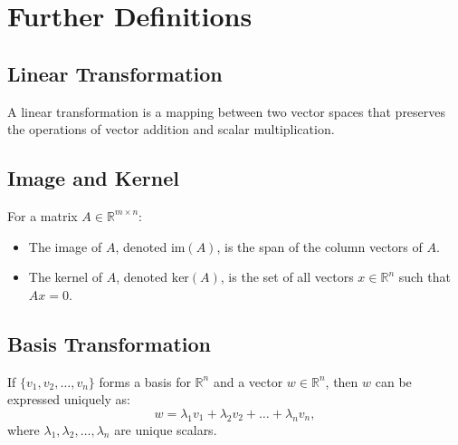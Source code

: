 \documentclass{article}
\begin{document}
\section*{Further Definitions}
\subsection*{Linear Transformation}
A linear transformation is a mapping between two vector spaces that preserves the operations of vector addition and scalar multiplication.

\subsection*{Image and Kernel}
For a matrix $A \in \mathbb{R}^{m \times n}$:
\begin{itemize}
    \item The image of $A$, denoted $\text{im}(A)$, is the span of the column vectors of $A$.
    \item The kernel of $A$, denoted $\text{ker}(A)$, is the set of all vectors $x \in \mathbb{R}^n$ such that $Ax = 0$.
\end{itemize}

\subsection*{Basis Transformation}
If $\{v_1, v_2, \ldots, v_n\}$ forms a basis for $\mathbb{R}^n$ and a vector $w \in \mathbb{R}^n$, then $w$ can be expressed uniquely as:
\begin{equation*}
    w = \lambda_1v_1 + \lambda_2v_2 + \ldots + \lambda_nv_n,
\end{equation*}
where $\lambda_1, \lambda_2, \ldots, \lambda_n$ are unique scalars.
\end{document}
